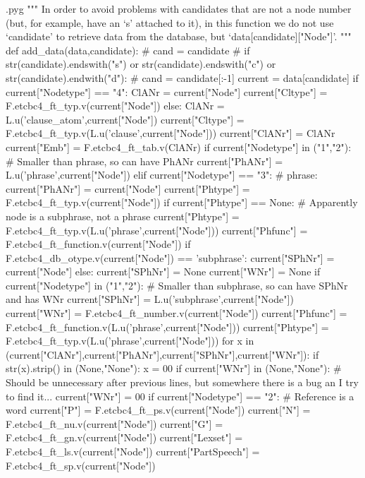 \documentclass{report}
\makeatletter
\newenvironment{python}{%
  \VerbatimEnvironment
  \minted@resetoptions
  \setkeys{minted@opt}{}
      \begin{VerbatimOut}{\jobname.pyg}}
{%
      \end{VerbatimOut}
      \minted@pygmentize{python}
      \DeleteFile{\jobname.pyg}}
\makeatother
\begin{document}
\begin{python}
""" In order to avoid problems with candidates that are not a node number 
    (but, for example, have an `s' attached to it), in this function we
    do not use `candidate' to retrieve data from the database, but
    `data[candidate]["Node"]'.
"""
def add_data(data,candidate):
#    cand = candidate
#    if str(candidate).endswith("s") or str(candidate).endswith("c") or str(candidate).endwith("d"):
#        cand = candidate[:-1]
    current = data[candidate]
    if current["Nodetype"] == "4":
        ClANr = current["Node"]
        current["Cltype"] = F.etcbc4_ft_typ.v(current["Node"])
    else:
        ClANr = L.u('clause_atom',current["Node"])
        current["Cltype"] = F.etcbc4_ft_typ.v(L.u('clause',current["Node"]))
    current["ClANr"] = ClANr
    current["Emb"] = F.etcbc4_ft_tab.v(ClANr)
    if current["Nodetype"] in ("1","2"): # Smaller than phrase, so can have PhANr
        current["PhANr"] = L.u('phrase',current["Node"])
    elif current["Nodetype"] == "3": # phrase:
        current["PhANr"] = current["Node"]
        current["Phtype"] = F.etcbc4_ft_typ.v(current["Node"])
        if current["Phtype"] == None: # Apparently node is a subphrase, not a phrase
            current["Phtype"] = F.etcbc4_ft_typ.v(L.u('phrase',current["Node"]))
        current["Phfunc"] = F.etcbc4_ft_function.v(current["Node"])
        if F.etcbc4_db_otype.v(current["Node"]) == 'subphrase':
            current["SPhNr"] = current["Node"]
        else:
            current["SPhNr"] = None
        current["WNr"] = None
    if current["Nodetype"] in ("1","2"): # Smaller than subphrase, so can have SPhNr and has WNr
        current["SPhNr"] = L.u('subphrase',current["Node"])
        current["WNr"] = F.etcbc4_ft_number.v(current["Node"])
        current["Phfunc"] = F.etcbc4_ft_function.v(L.u('phrase',current["Node"]))
        current["Phtype"] = F.etcbc4_ft_typ.v(L.u('phrase',current["Node"]))
    for x in (current["ClANr"],current["PhANr"],current["SPhNr"],current["WNr"]):
        if str(x).strip() in (None,"None"):
            x = 00 
    if current["WNr"] in (None,"None"): # Should be unnecessary after previous lines, but somewhere there is a bug an I try to find it...
        current["WNr"] = 00
    if current["Nodetype"] == "2": # Reference is a word
        current["P"] = F.etcbc4_ft_ps.v(current["Node"])
        current["N"] = F.etcbc4_ft_nu.v(current["Node"])
        current["G"] = F.etcbc4_ft_gn.v(current["Node"])
        current["Lexset"] = F.etcbc4_ft_ls.v(current["Node"])
        current["PartSpeech"] = F.etcbc4_ft_sp.v(current["Node"])

\end{python}
\end{document}
